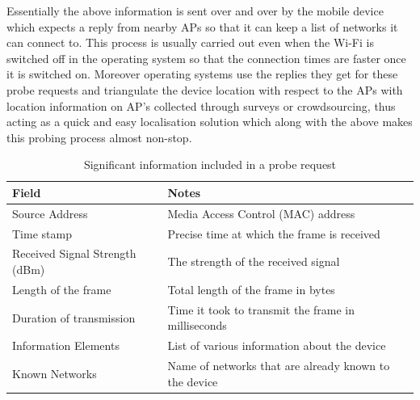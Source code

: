 Essentially the above information is sent over and over by the mobile device which expects a reply from nearby APs so that it can keep a list of networks it can connect to.
This process is usually carried out even when the Wi-Fi is switched off in the operating system so that the connection times are faster once it is switched on.
Moreover operating systems use the replies they get for these probe requests and triangulate the device location with respect to the APs with location information on AP's collected through surveys or crowdsourcing, thus acting as a quick and easy localisation solution which along with the above makes this probing process almost non-stop. 

\begin{table}
  \footnotesize
  \begin{center}
    \begin{tabular}{lp{6.5cm}}
      \toprule
        Field & Notes\\
      \midrule
        \addlinespace[0.2cm]
        Source Address & Media Access Control (MAC) address\\
        Time stamp & Precise time at which the frame is received\\
        Received Signal Strength (dBm) & The strength of the received signal\\
        Length of the frame & Total length of the frame in bytes\\
        Duration of transmission & Time it took to transmit the frame in milliseconds\\
        Information Elements & List of various information about the device\\
        Known Networks & Name of networks that are already known to the device\\
      \bottomrule
    \end{tabular}
  \end{center}
  \caption{Significant information included in a probe request}
  \label{table:collection:proberequest}
\end{table}


